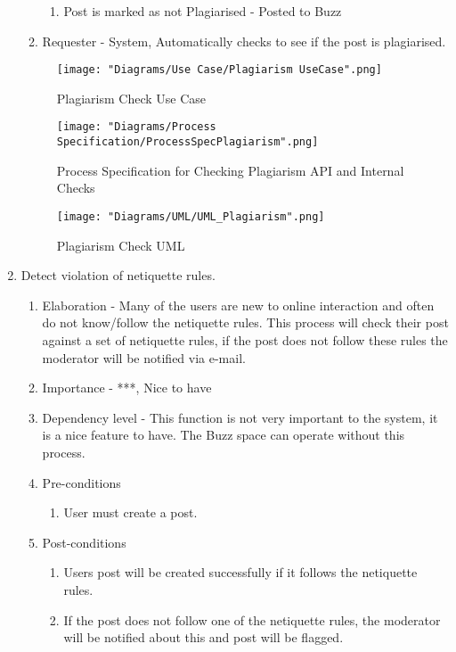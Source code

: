 \documentclass[12pt]{article}
\begin{document}
\begin{enumerate}
\begin{enumerate}
\begin{enumerate}
    	\item Post is marked as not Plagiarised - Posted to Buzz
    \end{enumerate}
    \item Requester - System, Automatically checks to see if the post is plagiarised.
  \end{enumerate}
\begin{figure}[h]
	\centering
	\texttt{[image: "Diagrams/Use Case/Plagiarism UseCase".png]}
	\caption{Plagiarism Check Use Case}
\end{figure}
\begin{figure}[h]
	\centering
	\texttt{[image: "Diagrams/Process Specification/ProcessSpecPlagiarism".png]}
	\caption{Process Specification for Checking Plagiarism API and Internal Checks}
\end{figure}
\begin{figure}[h]
	\centering
	\texttt{[image: "Diagrams/UML/UML\_Plagiarism".png]}
	\caption{Plagiarism Check UML}
\end{figure}
\clearpage %
   \item Detect violation of netiquette rules. %
	\begin{enumerate}
  	\item Elaboration - Many of the users are new to online interaction and often do not know/follow the netiquette rules. This process will check their post against a set of netiquette rules, if the post does not follow these rules the moderator will be notified via e-mail.
   	 	\item Importance - ***, Nice to have
   	 	\item Dependency level - This function is not very important to the system, it is a nice feature to have. The Buzz space can operate without this process.
   	 	\item Pre-conditions
   		\begin{enumerate}
    		\item User must create a post.
    	\end{enumerate}
     	\item Post-conditions
    	\begin{enumerate}
  	  		\item Users post will be created successfully if it follows the netiquette rules.
  	  		\item If the post does not follow one of the netiquette rules, the moderator will be notified about this and post will be flagged.

\end{enumerate}
\end{enumerate}
\end{enumerate}
\end{document}
